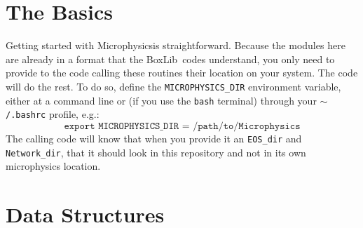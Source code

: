 \documentclass[11pt]{book}
\newcommand{\boxlib}{{\sf BoxLib}}
\newcommand{\microphysics}{{\sf Microphysics}}
\begin{document}
\chapter{The Basics}

Getting started with \microphysics is straightforward. Because the modules here are 
already in a format that the \boxlib\ codes understand, you only need to 
provide to the code calling these routines their location on your system. The 
code will do the rest. To do so, define the {\tt MICROPHYSICS\_DIR} 
environment variable, either at a command line or (if you use the {\tt bash} terminal) 
through your {\tt $\sim$/.bashrc} profile, e.g.:
\begin{equation*}
  \texttt{export MICROPHYSICS\_DIR = /path/to/Microphysics}
\end{equation*}
The calling code will know that when you provide it an {\tt EOS\_dir} and {\tt Network\_dir},
that it should look in this repository and not in its own microphysics location.

\chapter{Data Structures}
\label{sec:data_structures}
\end{document}
